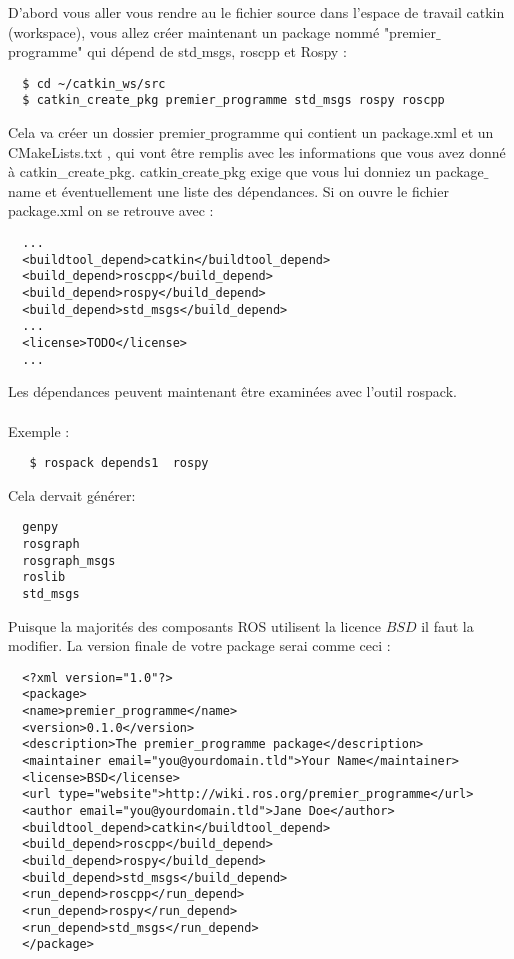 \documentclass[a4paper,french, titlepage]{book}
\begin{document}
D'abord vous aller vous rendre au le fichier source dans l'espace de travail catkin (workspace), vous allez créer maintenant un package nommé "premier$\_$programme" qui dépend de std$\_$msgs, roscpp et Rospy : 
  
\begin{Verbatim}
  $ cd ~/catkin_ws/src
  $ catkin_create_pkg premier_programme std_msgs rospy roscpp
\end{Verbatim}

Cela va créer un dossier premier$\_$programme qui contient un package.xml et un CMakeLists.txt , qui vont être remplis avec les informations que vous avez donné à catkin\_create$\_$pkg. catkin$\_$create$\_$pkg exige que vous lui donniez un package$\_$name et éventuellement une liste des dépendances.
Si on ouvre le fichier package.xml on se retrouve avec : 

\begin{Verbatim}
  ...
  <buildtool_depend>catkin</buildtool_depend>
  <build_depend>roscpp</build_depend>
  <build_depend>rospy</build_depend>
  <build_depend>std_msgs</build_depend>
  ...
  <license>TODO</license> 
  ...
\end{Verbatim}
Les dépendances peuvent maintenant être examinées avec l'outil rospack.\\\\
Exemple : 
\begin{Verbatim}
   $ rospack depends1  rospy
\end{Verbatim}

Cela dervait générer: 

\begin{Verbatim}
  genpy
  rosgraph
  rosgraph_msgs
  roslib
  std_msgs
\end{Verbatim}

Puisque la majorités des composants ROS utilisent la licence  $BSD$ il faut la modifier. La version finale de votre package serai comme ceci :\\
\begin{Verbatim}
  <?xml version="1.0"?>
  <package>
  <name>premier_programme</name>
  <version>0.1.0</version>
  <description>The premier_programme package</description>
  <maintainer email="you@yourdomain.tld">Your Name</maintainer>
  <license>BSD</license>
  <url type="website">http://wiki.ros.org/premier_programme</url>
  <author email="you@yourdomain.tld">Jane Doe</author>
  <buildtool_depend>catkin</buildtool_depend>
  <build_depend>roscpp</build_depend>
  <build_depend>rospy</build_depend>
  <build_depend>std_msgs</build_depend>
  <run_depend>roscpp</run_depend>
  <run_depend>rospy</run_depend>
  <run_depend>std_msgs</run_depend>
  </package>
\end{Verbatim}
\end{document}
